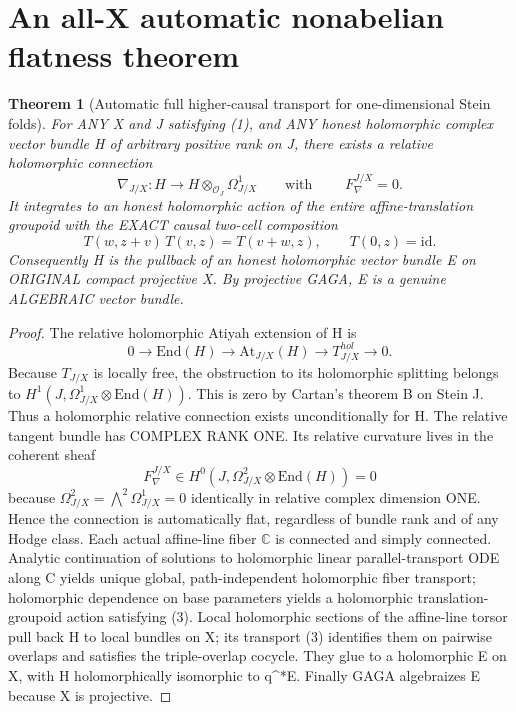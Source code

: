 \documentclass[11pt]{article}
\newtheorem{theorem}{Theorem}
\begin{document}
\section{An all-X automatic nonabelian flatness theorem}
\begin{theorem}[Automatic full higher-causal transport for one-dimensional Stein folds]
For ANY X and J satisfying (1), and ANY honest holomorphic
complex vector bundle H of arbitrary positive rank on J,
there exists a relative holomorphic connection
\[
 \nabla_{J/X}:H\longrightarrow
    H\otimes_{\mathcal O_J}\Omega^1_{J/X}
 \qquad\text{with }\qquad F_{\nabla}^{J/X}=0.
 \tag{2}
\]
It integrates to an honest holomorphic action of the
entire affine-translation groupoid with the EXACT causal two-cell
composition
\[
 T(w,z+v)\,T(v,z)=T(v+w,z),\qquad T(0,z)=\mathrm{id}.
 \tag{3}
\]
Consequently H is the pullback of an honest holomorphic vector
bundle E on ORIGINAL compact projective X. By projective GAGA,
E is a genuine ALGEBRAIC vector bundle.
\end{theorem}
\begin{proof}
The relative holomorphic Atiyah extension of H is
\[
0\to\mathrm{End}(H)\to \mathrm{At}_{J/X}(H)
       \to T^{hol}_{J/X}\to0.
\]
Because $T_{J/X}$ is locally free, the obstruction to its
holomorphic splitting belongs to
$H^1(J,\Omega^1_{J/X}\otimes\mathrm{End}(H))$.
This is zero by Cartan's theorem B on Stein J. Thus a
holomorphic relative connection exists unconditionally
for H. The relative tangent bundle has COMPLEX RANK ONE.
Its relative curvature lives in the coherent sheaf
\[
   F_{\nabla}^{J/X}\in
  H^0(J,\Omega^2_{J/X}\otimes\mathrm{End}(H))=0
\]
because $\Omega^2_{J/X}=\bigwedge^2\Omega^1_{J/X}=0$
identically in relative complex dimension ONE. Hence the
connection is automatically flat, regardless of bundle rank
and of any Hodge class. Each actual affine-line fiber
$\mathbb C$ is connected and simply connected. Analytic
continuation of solutions to holomorphic linear
parallel-transport ODE along C yields unique global,
path-independent holomorphic fiber transport; holomorphic
dependence on base parameters yields a holomorphic
translation-groupoid action satisfying (3).
Local holomorphic sections of the affine-line torsor
pull back H to local bundles on X; its transport (3)
identifies them on pairwise overlaps and satisfies the
triple-overlap cocycle. They glue to a holomorphic E
on X, with H holomorphically isomorphic to q^*E.
Finally GAGA algebraizes E because X is projective.
\end{proof}
\end{document}
